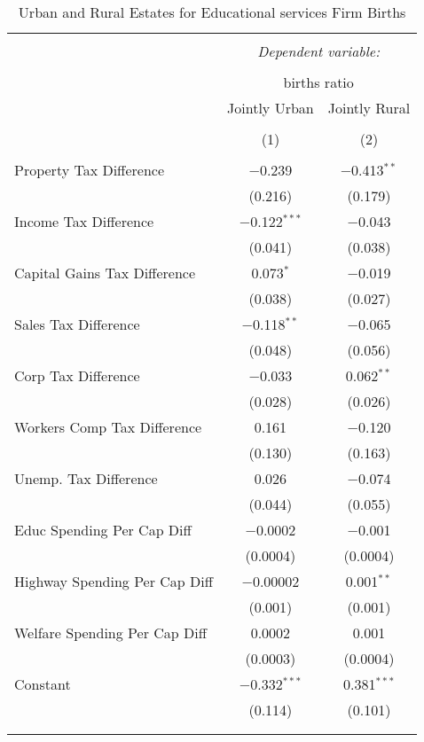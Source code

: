 
\begin{table}[!htbp] \centering 
  \caption{Urban and Rural Estates for  Educational services Firm Births} 
  \label{} 
\begin{tabular}{@{\extracolsep{5pt}}lcc} 
\\[-1.8ex]\hline 
\hline \\[-1.8ex] 
 & \multicolumn{2}{c}{\textit{Dependent variable:}} \\ 
\cline{2-3} 
\\[-1.8ex] & \multicolumn{2}{c}{births ratio} \\ 
 & Jointly Urban & Jointly Rural \\ 
\\[-1.8ex] & (1) & (2)\\ 
\hline \\[-1.8ex] 
 Property Tax Difference & $-$0.239 & $-$0.413$^{**}$ \\ 
  & (0.216) & (0.179) \\ 
  Income Tax Difference & $-$0.122$^{***}$ & $-$0.043 \\ 
  & (0.041) & (0.038) \\ 
  Capital Gains Tax Difference & 0.073$^{*}$ & $-$0.019 \\ 
  & (0.038) & (0.027) \\ 
  Sales Tax Difference & $-$0.118$^{**}$ & $-$0.065 \\ 
  & (0.048) & (0.056) \\ 
  Corp Tax Difference & $-$0.033 & 0.062$^{**}$ \\ 
  & (0.028) & (0.026) \\ 
  Workers Comp Tax Difference & 0.161 & $-$0.120 \\ 
  & (0.130) & (0.163) \\ 
  Unemp. Tax Difference & 0.026 & $-$0.074 \\ 
  & (0.044) & (0.055) \\ 
  Educ Spending Per Cap Diff & $-$0.0002 & $-$0.001 \\ 
  & (0.0004) & (0.0004) \\ 
  Highway Spending Per Cap Diff & $-$0.00002 & 0.001$^{**}$ \\ 
  & (0.001) & (0.001) \\ 
  Welfare Spending Per Cap Diff & 0.0002 & 0.001 \\ 
  & (0.0003) & (0.0004) \\ 
  Constant & $-$0.332$^{***}$ & 0.381$^{***}$ \\ 
  & (0.114) & (0.101) \\ 
 \hline \\[-1.8ex] 
\hline 
\hline \\[-1.8ex] 
\end{tabular} 
\end{table} 
